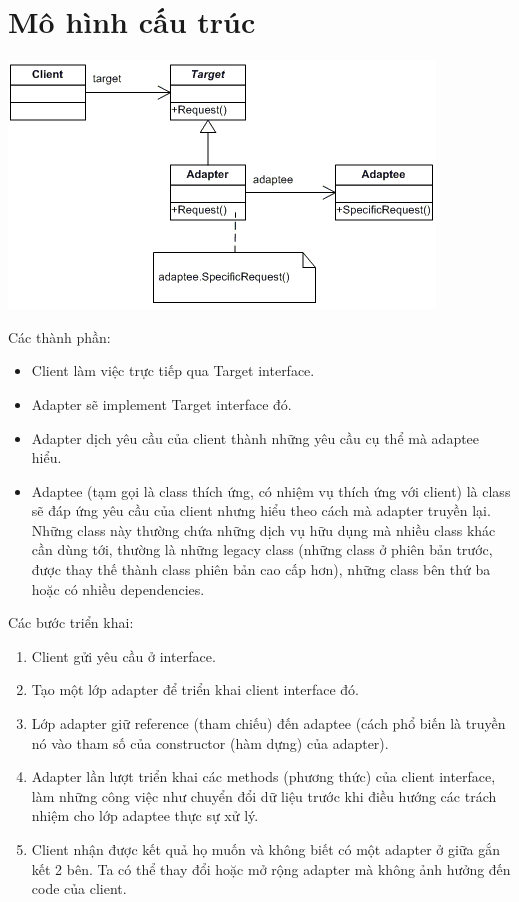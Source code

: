 \section{Mô hình cấu trúc}
\begin{center}
\includegraphics{GALLEYS/images/chapter6/diagram}\\
\end{center}
Các thành phần:
\begin{itemize}
\item Client làm việc trực tiếp qua Target interface.
\item Adapter sẽ implement Target interface đó.
\item Adapter dịch yêu cầu của client thành những yêu cầu cụ thể mà adaptee hiểu.
\item Adaptee (tạm gọi là class thích ứng, có nhiệm vụ thích ứng với client) là class sẽ đáp ứng yêu cầu của client nhưng hiểu theo cách mà adapter truyền lại. Những class này thường chứa những dịch vụ hữu dụng mà nhiều class khác cần dùng tới, thường là những legacy class (những class ở phiên bản trước, được thay thế thành class phiên bản cao cấp hơn), những class bên thứ ba hoặc có nhiều dependencies.
\end{itemize}
Các bước triển khai:
\begin{enumerate}
\item Client gửi yêu cầu ở interface.
\item Tạo một lớp adapter để triển khai client interface đó.
\item Lớp adapter giữ reference (tham chiếu) đến adaptee (cách phổ biến là truyền nó vào tham số của constructor (hàm dựng) của adapter).
\item Adapter lần lượt triển khai các methods (phương thức) của client interface, làm những công việc như chuyển đổi dữ liệu trước khi điều hướng các trách nhiệm cho lớp adaptee thực sự xử lý.
\item Client nhận được kết quả họ muốn và không biết có một adapter ở giữa gắn kết 2 bên. Ta có thể thay đổi hoặc mở rộng adapter mà không ảnh hưởng đến code của client.
\end{enumerate}
